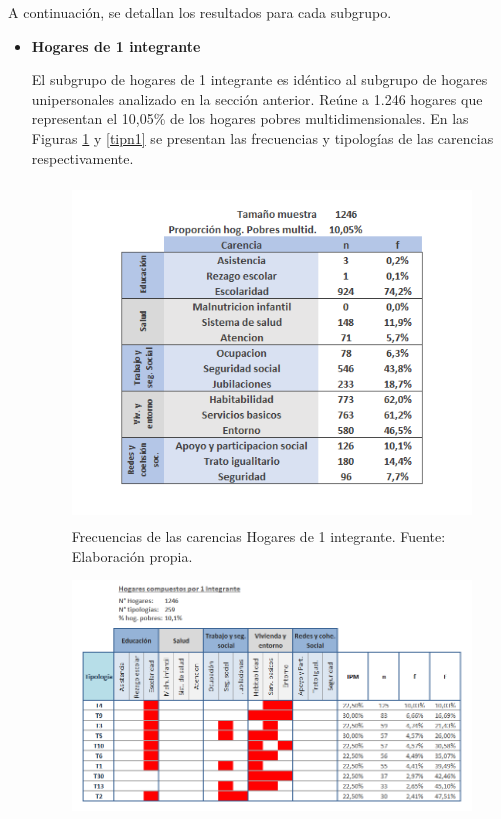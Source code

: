 \documentclass[12pt,letterpaper,spanish]{article}
\begin{document}
A continuación, se detallan los resultados para cada subgrupo.
\begin{itemize}
    \item \textbf{Hogares de 1 integrante}

    El subgrupo de hogares de 1 integrante es idéntico al subgrupo de hogares unipersonales analizado en la sección anterior. Reúne a 1.246 hogares que representan el 10,05\% de los hogares pobres multidimensionales. En las Figuras \ref{fren1} y \ref{tipn1} se presentan las frecuencias y tipologías de las carencias respectivamente. 

    \begin{figure}[H]
        \centering 
        \includegraphics[height=9cm]{HOGARES/tabla_unip.png}
        \caption{Frecuencias de las carencias Hogares de 1 integrante. Fuente: Elaboración propia.}
        \label{fren1}
    \end{figure}
    \begin{figure}[H]
        \centering
        \includegraphics[width=\textwidth]{Mati N/n=1.png}

\end{figure}
\end{itemize}
\end{document}
